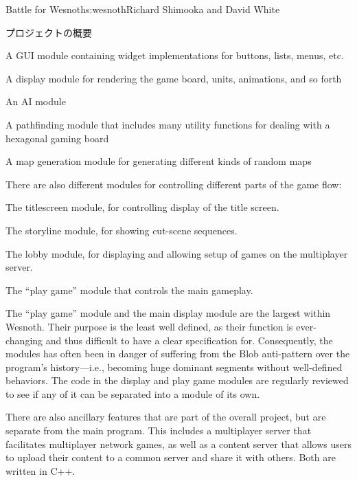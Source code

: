 \begin{aosachapter}{Battle for Wesnoth}{s:wesnoth}{Richard Shimooka and David White}
\begin{aosasect1}{プロジェクトの概要}
\begin{aosaitemize}
  \item A GUI module containing widget implementations for buttons,
  lists, menus, etc.

  \item A display module for rendering the game board, units,
  animations, and so forth

  \item An AI module

  \item A pathfinding module that includes many utility functions for
  dealing with a hexagonal gaming board

  \item A map generation module for generating different kinds of
  random maps

\end{aosaitemize}

There are also different modules for controlling different parts of
the game flow:

\begin{aosaitemize}

  \item The titlescreen module, for controlling display of the
  title screen.

  \item The storyline module, for showing cut-scene sequences.

  \item The lobby module, for displaying and allowing setup of games
  on the multiplayer server.

  \item The ``play game'' module that controls the main gameplay.

\end{aosaitemize}

The ``play game'' module and the main display module are the largest
within Wesnoth.  Their purpose is the least well defined, as their
function is ever-changing and thus difficult to have a clear
specification for. Consequently, the modules has often been in danger
of suffering from the Blob anti-pattern over the program's
history---i.e., becoming huge dominant segments without well-defined
behaviors.  The code in the display and play game modules are
regularly reviewed to see if any of it can be separated into a module
of its own.

There are also ancillary features that are part of the overall
project, but are separate from the main program. This includes a
multiplayer server that facilitates multiplayer network games, as well
as a content server that allows users to upload their content to a
common server and share it with others. Both are written in C++.


\end{aosasect1}
\end{aosachapter}

